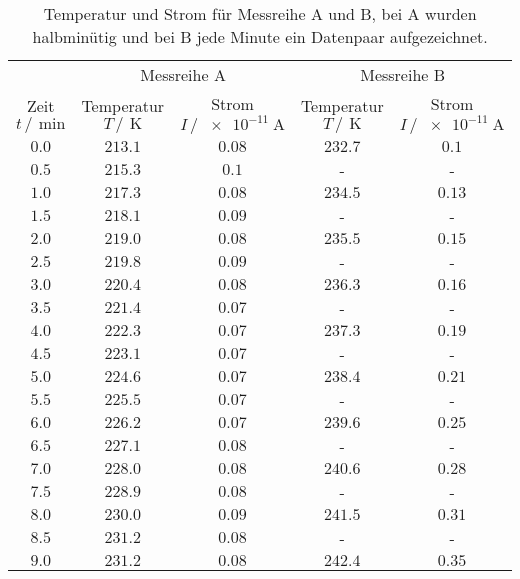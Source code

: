\begin{table}
    \centering
    \caption{Temperatur und Strom für Messreihe A und B, bei A wurden halbminütig und bei B jede Minute ein Datenpaar aufgezeichnet.}
    \label{tab:Messdaten_roh}
    \begin{tabular}{c c c c c}
        \toprule
        &\multicolumn{2}{c}{Messreihe A}&\multicolumn{2}{c}{Messreihe B}\\
        Zeit $t \,/\,\SI{}{\minute}$&Temperatur $T \,/\,\SI{}{\kelvin}$ &Strom $I \,/\,\SI{e-11}{\ampere}$&Temperatur $T \,/\,\SI{}{\kelvin}$ &Strom $I \,/\,\SI{e-11}{\ampere}$\\
        \midrule
        $\num{0.0}$&$\num{213.1}$&$\num{0.08}$&$\num{232.7}$&$\num{0.1}$\\
        $\num{0.5}$&$\num{215.3}$&$\num{0.1}$&-&-\\
        $\num{1.0}$&$\num{217.3}$&$\num{0.08}$&$\num{234.5}$&$\num{0.13}$\\
        $\num{1.5}$&$\num{218.1}$&$\num{0.09}$&-&-\\
        $\num{2.0}$&$\num{219.0}$&$\num{0.08}$&$\num{235.5}$&$\num{0.15}$\\
        $\num{2.5}$&$\num{219.8}$&$\num{0.09}$&-&-\\
        $\num{3.0}$&$\num{220.4}$&$\num{0.08}$&$\num{236.3}$&$\num{0.16}$\\
        $\num{3.5}$&$\num{221.4}$&$\num{0.07}$&-&-\\
        $\num{4.0}$&$\num{222.3}$&$\num{0.07}$&$\num{237.3}$&$\num{0.19}$\\
        $\num{4.5}$&$\num{223.1}$&$\num{0.07}$&-&-\\
        $\num{5.0}$&$\num{224.6}$&$\num{0.07}$&$\num{238.4}$&$\num{0.21}$\\
        $\num{5.5}$&$\num{225.5}$&$\num{0.07}$&-&-\\
        $\num{6.0}$&$\num{226.2}$&$\num{0.07}$&$\num{239.6}$&$\num{0.25}$\\
        $\num{6.5}$&$\num{227.1}$&$\num{0.08}$&-&-\\
        $\num{7.0}$&$\num{228.0}$&$\num{0.08}$&$\num{240.6}$&$\num{0.28}$\\
        $\num{7.5}$&$\num{228.9}$&$\num{0.08}$&-&-\\
        $\num{8.0}$&$\num{230.0}$&$\num{0.09}$&$\num{241.5}$&$\num{0.31}$\\
        $\num{8.5}$&$\num{231.2}$&$\num{0.08}$&-&-\\
        $\num{9.0}$&$\num{231.2}$&$\num{0.08}$&$\num{242.4}$&$\num{0.35}$\\

\end{tabular}
\end{table}
